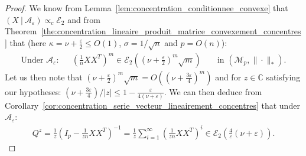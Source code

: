 \documentclass{ws-rmta}
\begin{document}
\begin{proof}
  We know from Lemma~\ref{lem:concentration_conditionnee_convexe} that $(X \ | \ \mathcal A_\varepsilon) \propto_c \mathcal E_2$ and from Theorem~\ref{the:concentration_lineaire_produit_matrice_convexement_concentres} that (here $\kappa = \nu + \frac{\varepsilon}{2} \leq O(1)$, $\sigma = 1/\sqrt n$ and $p= O(n)$):
  \begin{align*}
     \text{Under $\mathcal A_\varepsilon$:}&
     &\left(\frac{1}{n}XX^T\right)^m \in \mathcal E_2 \left( \left( \nu + \frac{\varepsilon}{2} \right)^{m} \sqrt m \right)&
    &\text{ in } \left(\mathcal M_{p}, \| \cdot \|_*\right).
   \end{align*}
   Let us then note that $\left(\nu + \frac{\varepsilon}{2} \right)^{m} \sqrt m  = O\left(\left(\nu + \frac{3\varepsilon}{4} \right)^{m}\right)$ and for $z \in \mathbb C$ satisfying our hypotheses: $(\nu + \frac{3\varepsilon}{4})/|z| \leq 1 - \frac{\varepsilon}{4(\nu + \varepsilon)}$.
   We can then deduce from Corollary~\ref{cor:concentration_serie_vecteur_lineairement_concentres} that under $\mathcal A_\varepsilon$:
   \begin{align*}
     Q^z = \frac{1}{z} \left(I_p - \frac{1}{zn}XX^T\right)^{-1} = \frac{1}{z}\sum_{i=1}^\infty \left(\frac{1}{zn}XX^T\right)^i \in \mathcal E_2 \left( \frac{4}{\varepsilon} (\nu + \varepsilon )\right).
   \end{align*}


\end{proof}
\end{document}
